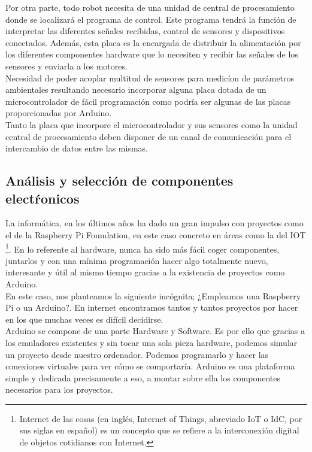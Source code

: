 Por otra parte, todo robot necesita de una unidad de central de procesamiento donde se localizará el programa de control. Este programa tendrá la función de interpretar las diferentes señales recibidas,
control de sensores y dispositivos conectados. Además, esta placa es la encargada de distribuir la alimentación por los diferentes componentes hardware que lo necesiten y recibir las señales de
los sensores y enviarla a los motores.\\

Necesidad de poder acoplar multitud de sensores para medicíon de parámetros ambientales resultando necesario incorporar alguna placa dotada de un microcontrolador de fácil programación como podría ser
algunas de las placas proporcionadas por Arduino.\\

Tanto la placa que incorpore el microcontrolador y sus sensores como la unidad central de procesamiento deben disponer de un canal de comunicación para el intercambio de datos entre las mismas.\\


\subsection{Análisis y selección de componentes electŕonicos}

La informática, en los últimos años ha dado un gran impulso con proyectos como el de la Raspberry Pi Foundation, en este caso concreto en áreas como la del IOT \footnote{
Internet de las cosas (en inglés, Internet of Things, abreviado IoT o​ IdC, por sus siglas en español​) es un concepto que se refiere a la interconexión digital de objetos cotidianos
con Internet.​}. En lo referente al hardware, nunca ha sido más fácil coger componentes, juntarlos y con una mínima programación hacer algo totalmente nuevo, interesante y útil al
mismo tiempo gracias a la existencia de proyectos como Arduino.\\

En este caso, nos planteamos la siguiente incógnita; ¿Empleamos una Raspberry Pi o un Arduino?. En internet encontramos tantos y tantos proyectos por 
hacer en los que muchas veces es difícil decidirse.\\

Arduino se compone de una parte Hardware y Software. Es por ello que gracias a los emuladores existentes y sin tocar una sola pieza hardware, podemos simular un proyecto desde 
nuestro ordenador. Podemos programarlo y hacer las conexiones virtuales para ver cómo se comportaría. Arduino es una plataforma simple y dedicada precisamente a eso, 
a montar sobre ella los componentes necesarios para los proyectos. \\


